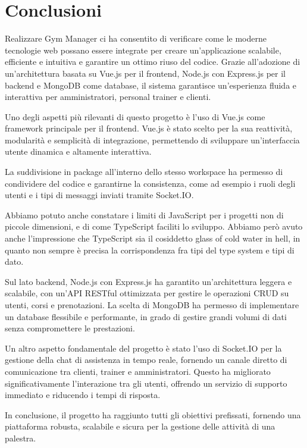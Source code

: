 \documentclass{report}
\begin{document}
\section{Conclusioni}
\par Realizzare Gym Manager ci ha consentito di verificare come le moderne tecnologie web possano essere integrate per creare un'applicazione scalabile, efficiente e intuitiva e garantire un ottimo riuso del codice. Grazie all'adozione di un'architettura basata su Vue.js per il frontend, Node.js con Express.js per il backend e MongoDB come database, il sistema garantisce un'esperienza fluida e interattiva per amministratori, personal trainer e clienti.
\par Uno degli aspetti più rilevanti di questo progetto è l'uso di Vue.js come framework principale per il frontend. Vue.js è stato scelto per la sua reattività, modularità e semplicità di integrazione, permettendo di sviluppare un'interfaccia utente dinamica e altamente interattiva.
\par La suddivisione in package all'interno dello stesso workspace ha permesso di condividere del codice e garantirne la consistenza, come ad esempio i ruoli degli utenti e i tipi di messaggi inviati tramite Socket.IO.
\par Abbiamo potuto anche constatare i limiti di JavaScript per i progetti non di piccole dimensioni, e di come TypeScript faciliti lo sviluppo. Abbiamo però avuto anche l'impressione che TypeScript sia il cosiddetto glass of cold water in hell, in quanto non sempre è precisa la corrispondenza fra tipi del type system e tipi di dato.
\par Sul lato backend, Node.js con Express.js ha garantito un'architettura leggera e scalabile, con un'API RESTful ottimizzata per gestire le operazioni CRUD su utenti, corsi e prenotazioni. La scelta di MongoDB ha permesso di implementare un database flessibile e performante, in grado di gestire grandi volumi di dati senza compromettere le prestazioni.
\par Un altro aspetto fondamentale del progetto è stato l'uso di Socket.IO per la gestione della chat di assistenza in tempo reale, fornendo un canale diretto di comunicazione tra clienti, trainer e amministratori. Questo ha migliorato significativamente l'interazione tra gli utenti, offrendo un servizio di supporto immediato e riducendo i tempi di risposta.
\par In conclusione, il progetto ha raggiunto tutti gli obiettivi prefissati, fornendo una piattaforma robusta, scalabile e sicura per la gestione delle attività di una palestra.


\end{document}
